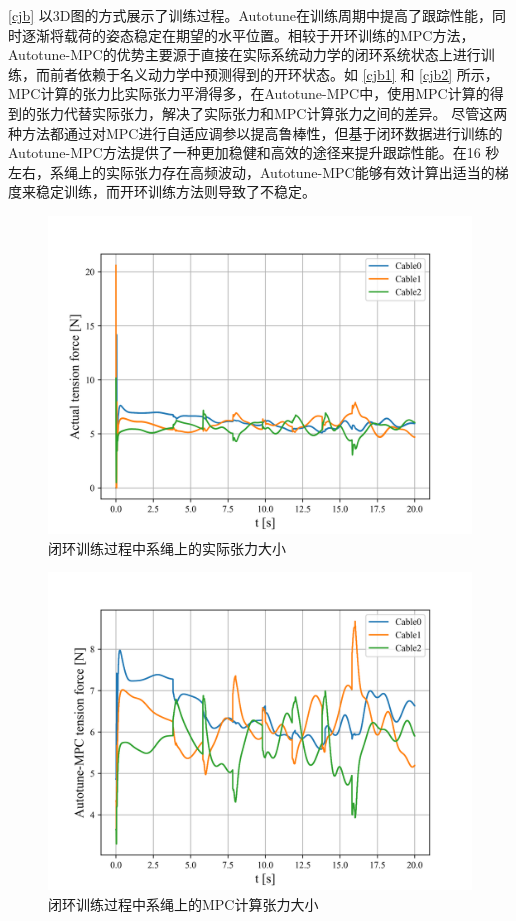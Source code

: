 \documentclass[lang=chs, degree=master, blindreview=true, winfonts=true]{yanputhesis}
\begin{document}
\autoref{cjb} 以3D图的方式展示了训练过程。Autotune在训练周期中提高了跟踪性能，同时逐渐将载荷的姿态稳定在期望的水平位置。相较于开环训练的MPC方法，Autotune-MPC的优势主要源于直接在实际系统动力学的闭环系统状态上进行训练，而前者依赖于名义动力学中预测得到的开环状态。如 \autoref{cjb1} 和 \autoref{cjb2} 所示，MPC计算的张力比实际张力平滑得多，在Autotune-MPC中，使用MPC计算的得到的张力代替实际张力，解决了实际张力和MPC计算张力之间的差异。
尽管这两种方法都通过对MPC进行自适应调参以提高鲁棒性，但基于闭环数据进行训练的Autotune-MPC方法提供了一种更加稳健和高效的途径来提升跟踪性能。在16
秒左右，系绳上的实际张力存在高频波动，Autotune-MPC能够有效计算出适当的梯度来稳定训练，而开环训练方法则导致了不稳定。
\begin{figure}[hbt!]
	\centering
	\includegraphics[width=32pc]{picture/kk/cable_actual_tensions_fig_8_6quad_ol.png} 
	\caption{闭环训练过程中系绳上的实际张力大小} 
	\label{cjb1}
\end{figure}


\begin{figure}[hbt!]
	\centering
	\includegraphics[width=32pc]{picture/kk/cable_MPC_tensions_fig_8_6quad_ol.png} 
	\caption{闭环训练过程中系绳上的MPC计算张力大小} 
	\label{cjb2}
\end{figure}
\end{document}
